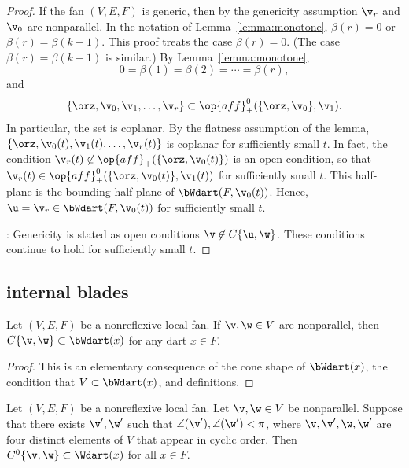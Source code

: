 \begin{proof}
If the fan $(V,E,F)$ is generic, then
by the genericity assumption $\v_r$ and
$\v_0$ are nonparallel.  In the notation of
Lemma~\ref{lemma:monotone}, $\beta(r) = 0$ or $\beta(r) =
\beta(k-1)$.  This proof treats the case $\beta(r)=0$. (The case
$\beta(r)=\beta(k-1)$ is similar.)  By Lemma~\ref{lemma:monotone},
\[ 0=\beta(1)=\beta(2)=\cdots=\beta(r),\] 
and 
\[ 
\{\orz,\v_0,\v_1,\ldots,\v_r\} \subset \op{aff}^0_+(\{\orz,\v_0\},\v_1).
\] 
In particular, the set is coplanar.  By the flatness assumption of
the lemma, $\{\orz,\v_0(t),\v_1(t),\ldots,\v_r(t)\}$ is coplanar for
sufficiently small $t$.  In fact, the condition $\v_r(t)\not\in
\op{aff}_+(\{\orz,\v_0(t)\})$ is an open condition, so that
$\v_r(t)\in \op{aff}^0_+(\{\orz,\v_0(t)\},\v_1(t))$ for sufficiently
small $t$.  This half-plane is the bounding half-plane of
$\bWdart(F,\v_0(t))$.  Hence, $\u = \v_r\in \bWdart(F,\v_0(t))$ for
sufficiently small $t$.

: Genericity is stated as open conditions $\v\not\in
C\{\u,\w\}$.  These conditions continue to hold for sufficiently small
$t$.
\end{proof}




\subsection{internal blades}


\begin{lemma}[]
Let $(V,E,F)$ be a nonreflexive local fan.
If $\v,\w\in V$ are nonparallel, then $C\{\v,\w\} \subset
\bWdart(x)$ for any dart $x\in F$.
\end{lemma}
%

\begin{proof} This is an elementary consequence of
the cone shape of $\bWdart(x)$,  the condition that $V\subset
\bWdart(x)$, and definitions.
\end{proof}


\begin{lemma} 
\label{lemma:internal}
Let $(V,E,F)$ be a nonreflexive local fan.  Let $\v,\w\in V$ be nonparallel.
Suppose that there exists $\v',\w'$ such that
$\angle(\v'),\angle(\w')<\pi$, where $\v,\v',\w,\w'$ are four
distinct elements of $V$ that appear in cyclic order.  Then
$C^0\{\v,\w\}\subset \Wdart(x)$ for all $x\in F$.
\end{lemma}
%
%

